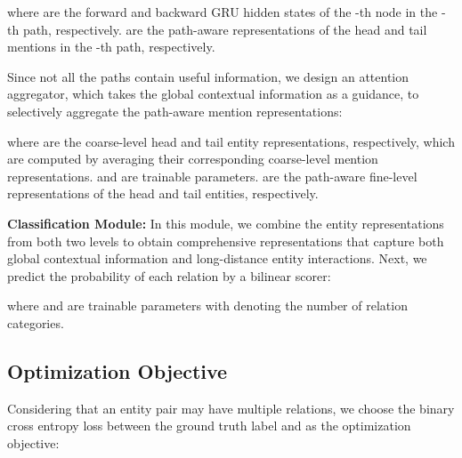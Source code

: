 \documentclass{article}
\begin{document}
where  are the forward and backward GRU hidden states of the -th node in the -th path, respectively. 
 are the path-aware representations of the head and tail mentions in the -th path, respectively. 

Since not all the paths contain useful information, we design an attention aggregator, which takes the global contextual information as a guidance, to selectively aggregate the path-aware mention representations: 

where  are the coarse-level head and tail entity representations, respectively, which are computed by averaging their corresponding coarse-level mention representations. 
 and  are trainable parameters. 
 are the path-aware fine-level representations of the head and tail entities, respectively. 

\noindent\textbf{Classification Module:}
In this module, we combine the entity representations from both two levels to obtain comprehensive representations that capture both global contextual information and long-distance entity interactions. 
Next, we predict the probability of each relation by a bilinear scorer: 

where  and   are trainable parameters with  denoting the number of relation categories. 

\subsection{Optimization Objective}
Considering that an entity pair may have multiple relations, we choose the binary cross entropy loss between the ground truth label  and  as the optimization objective: 
\end{document}
